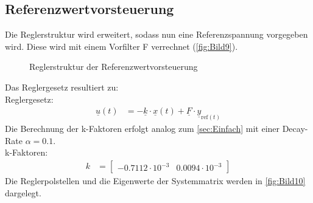 \clearpage

\subsection{Referenzwertvorsteuerung} \label{sec:Referenzwertvorsteuerung}

Die Reglerstruktur wird erweitert, sodass nun eine Referenzspannung vorgegeben wird. Diese wird mit einem Vorfilter F verrechnet (\autoref{fig:Bild9}).

\begin{figure}[H]
   \centering
   \caption[Reglerstruktur der Referenzwertvorsteuerung]{Reglerstruktur der Referenzwertvorsteuerung}
   \label{fig:Bild9}
\end{figure}

Das Reglergesetz resultiert zu:\\
\newline
Reglergesetz:
\begin{align}
    \underline{u}(t) &= -\underline{k}\cdot\underline{x}(t)+\underline{F}\cdot\underline{y}_{\mathrm{ref}(t)}
    \label{eq:Gleichung22}
\end{align}
\newline
Die Berechnung der k-Faktoren erfolgt analog zum \autoref{sec:Einfach} mit einer Decay-Rate $\alpha = 0.1$.\\
\newline
k-Faktoren:
\begin{align}
    k &= 
    \begin{bmatrix}
        -0.7112\cdot 10^{-3} & 0.0094\cdot 10^{-3}
    \end{bmatrix}
    \label{eq:Gleichung23}
\end{align}
\newline
Die Reglerpolstellen und die Eigenwerte der Systemmatrix werden in \autoref{fig:Bild10} dargelegt.

